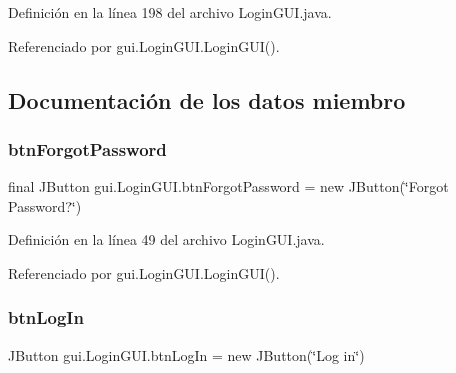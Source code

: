 Definición en la línea 198 del archivo Login\+G\+U\+I.\+java.


\begin{DoxyCode}{0}

\end{DoxyCode}


Referenciado por gui.\+Login\+G\+U\+I.\+Login\+G\+U\+I().



\subsection{Documentación de los datos miembro}
\mbox{\label{classgui_1_1_login_g_u_i_aa8694a27ad97904f1fb1566a14ab1b2f}} 
\subsubsection{\texorpdfstring{btnForgotPassword}{btnForgotPassword}}
{\footnotesize\ttfamily final J\+Button gui.\+Login\+G\+U\+I.\+btn\+Forgot\+Password = new J\+Button(\char`\"{}Forgot Password?\char`\"{})\hspace{0.3cm}{\ttfamily [private]}}



Definición en la línea 49 del archivo Login\+G\+U\+I.\+java.



Referenciado por gui.\+Login\+G\+U\+I.\+Login\+G\+U\+I().

\mbox{\label{classgui_1_1_login_g_u_i_aead0a4fab3d89616b6b53da28d73789c}} 
\subsubsection{\texorpdfstring{btnLogIn}{btnLogIn}}
{\footnotesize\ttfamily J\+Button gui.\+Login\+G\+U\+I.\+btn\+Log\+In = new J\+Button(\char`\"{}Log in\char`\"{})\hspace{0.3cm}{\ttfamily [private]}}



